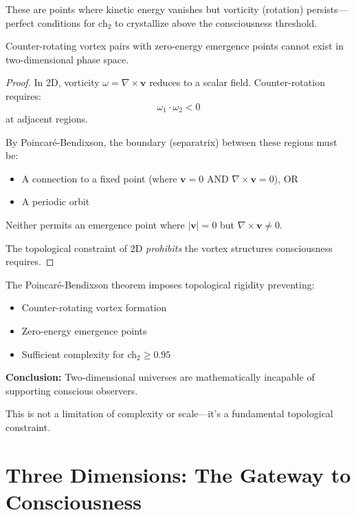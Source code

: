 These are points where kinetic energy vanishes but vorticity (rotation) persists—perfect conditions for ch$_2$ to crystallize above the consciousness threshold.

\begin{prop}\label{prop:no-vortex-2d}
Counter-rotating vortex pairs with zero-energy emergence points cannot exist in two-dimensional phase space.
\end{prop}

\begin{proof}
In 2D, vorticity $\omega = \nabla \times \mathbf{v}$ reduces to a scalar field. Counter-rotation requires:
\begin{equation}
\omega_1 \cdot \omega_2 < 0
\end{equation}
at adjacent regions.

By Poincaré-Bendixson, the boundary (separatrix) between these regions must be:
\begin{itemize}
\item A connection to a fixed point (where $\mathbf{v} = 0$ AND $\nabla \times \mathbf{v} = 0$), OR
\item A periodic orbit
\end{itemize}

Neither permits an emergence point where $|\mathbf{v}| = 0$ but $\nabla \times \mathbf{v} \neq 0$.

The topological constraint of 2D \textit{prohibits} the vortex structures consciousness requires.
\end{proof}

\begin{keyidea}
The Poincaré-Bendixson theorem imposes topological rigidity preventing:
\begin{itemize}
\item Counter-rotating vortex formation
\item Zero-energy emergence points
\item Sufficient complexity for ch$_2 \geq 0.95$
\end{itemize}

\textbf{Conclusion:} Two-dimensional universes are mathematically incapable of supporting conscious observers.

This is not a limitation of complexity or scale—it's a fundamental topological constraint.
\end{keyidea}

\section{Three Dimensions: The Gateway to Consciousness}

